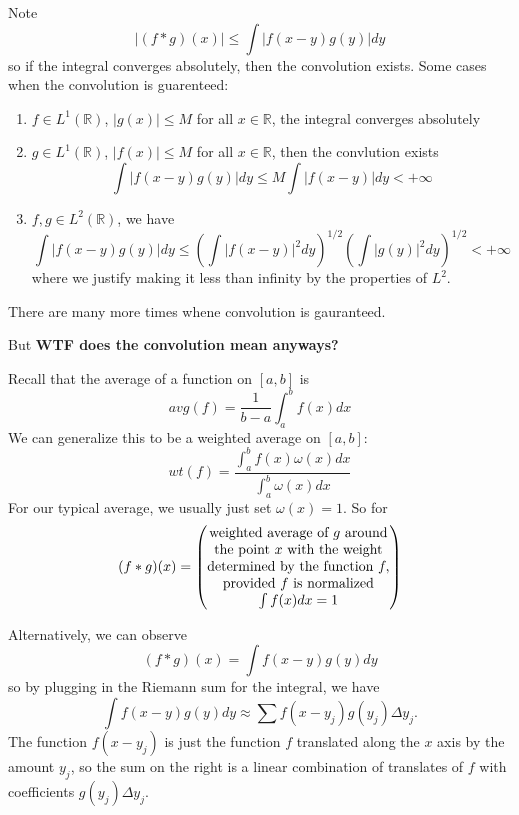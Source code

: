 Note
\begin{equation}
|(f*g)(x)|\leq\int|f(x-y)g(y)|dy
\end{equation}
so if the integral converges absolutely, then the
convolution exists. Some cases when the convolution is guarenteed:
\begin{enumerate}
\item $f\in L^{1}(\mathbb{R})$, $|g(x)|\leq M$ for all
  $x\in\mathbb{R}$, the integral converges absolutely
\item $g\in L^{1}(\mathbb{R})$, $|f(x)|\leq M$ for all
  $x\in\mathbb{R}$, then the convlution exists
\begin{equation}
\int|f(x-y)g(y)|dy\leq M\int|f(x-y)|dy<+\infty
\end{equation}
\item $f,g\in L^{2}(\mathbb{R})$, we have
\begin{equation}
\int|f(x-y)g(y)|dy\leq\left(\int|f(x-y)|^2dy\right)^{1/2}\left(\int|g(y)|^2dy\right)^{1/2}<+\infty
\end{equation}
where we justify making it less than infinity by the
properties of $L^2$.
\end{enumerate}
There are many more times whene convolution is gauranteed.

But \textbf{WTF does the convolution mean anyways?}

Recall that the average of a function on $[a,b]$ is
\begin{equation}
avg(f) = \frac{1}{b-a}\int^{b}_{a}f(x)dx
\end{equation}
We can generalize this to be a weighted average on $[a,b]$:
\begin{equation}
wt(f) = \frac{\int^{b}_{a}f(x)\omega(x)dx}{\int^{b}_{a}\omega(x)dx}
\end{equation}
For our typical average, we usually just set
$\omega(x)=1$. So for
\begin{equation}
(f*g)(x)
  = \begin{pmatrix}$weighted$\ $average$\ $of$\ g\ $around$\\
$the$\ $point$\ x $ with$\ $the$\ $weight$\\ 
$determined$\ $by$\ $the$\ $function$\ f,\\ 
$provided$\ f $ is$\ $normalized$\\ 
\int f(x)dx=1\end{pmatrix}
\end{equation}

Alternatively, we can observe
\begin{equation}
(f*g)(x) = \int f(x-y)g(y)dy
\end{equation}
so by plugging in the Riemann sum for the integral, we have
\begin{equation}
\int f(x-y)g(y)dy \approx \sum f(x-y_j)g(y_j)\Delta y_j.
\end{equation}
The function $f(x-y_j)$ is just the function $f$ translated
along the $x$ axis by the amount $y_j$, so the sum on the
right is a linear combination of translates of $f$ with
coefficients $g(y_j)\Delta y_j$. 

